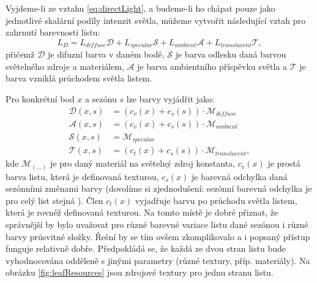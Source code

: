 Vyjdeme-li ze vztahu \ref{eq:directLight}, a budeme-li ho chápat pouze jako jednotlivé skalární podíly intenzit světla, můžeme vytvořit následující vztah pro zahrnutí barevnosti listu: 
\begin{equation}
\label{eq:color_solution}
L_D = L_{diffuse}  \mathcal{D} + L_{specular} \mathcal{S} + L_{ambient} \mathcal{A}   + L_{translucent} \mathcal{T} ,
\end{equation}
přičemž $\mathcal{D}$ je difuzní barva v daném bodě, $\mathcal{S}$ je barva odlesku daná barvou světelného zdroje a materiálem, $\mathcal{A}$ je barva ambientního příspěvku světla a $\mathcal{T}$ je barva vzniklá průchodem světla listem.

 Pro konkrétní bod $x$ a sezónu $s$ lze barvy vyjádřit jako:
\begin{align}
\label{eq:color_def}
\mathcal{D}(x,s) &= (c_v(x) + c_s(s))\cdot \mathcal{M}_{diffuse}\nonumber\\
\mathcal{A}(x,s) &= (c_v(x) + c_s(s))\cdot \mathcal{M}_{ambient}\nonumber\\
\mathcal{S}(x,s) &= \mathcal{M}_{specular}\nonumber\\
\mathcal{T}(x,s) &= (c_t(x) + c_s(s))\cdot \mathcal{M}_{translucent} ,
\end{align}
kde $ \mathcal{M}_{(\dots)}$ je pro daný materiál na světelný zdroj konstanta, $c_v(x)$ je prostá barva listu, která je definovaná texturou, $c_s(x)$ je barevná odchylka daná sezónními změnami barvy (dovolíme si zjednodušení: sezónní barevná odchylka je pro celý list stejná ). Člen $c_t(x)$ vyjadřuje barvu po průchodu světla listem, která je rovněž definovaná texturou. Na tomto místě je dobré přiznat, že správnější by bylo uvažovat pro různé barevné variace listu dané sezónou i různé barvy průsvitné složky. Řešní by se tím ovšem zkomplikovalo a i popsaný přístup funguje relativně dobře.
Předpokládá se, že každá ze dvou stran listu bude vyhodnocována odděleně s jinými parametry (různé textury, příp. materiály). Na obrázku \ref{fig:leafResources} jsou zdrojové textury pro jednu stranu listu.
